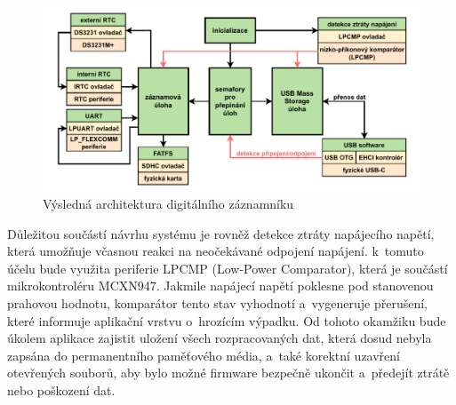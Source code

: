 \begin{figure}[h]
    \centering
    \includegraphics[width=1.00\textwidth]{obrazky-figures/system_architecture.pdf}
    
    \caption{Výsledná architektura digitálního záznamníku}
    \label{fig:system-architecture}
\end{figure}

\newpage

Důležitou součástí návrhu systému je rovněž detekce ztráty napájecího napětí, která umožňuje včasnou reakci na neočekávané odpojení napájení. k~tomuto účelu bude využita periferie LPCMP (Low-Power Comparator), která je součástí mikrokontroléru MCXN947. Jakmile napájecí napětí poklesne pod stanovenou prahovou hodnotu, komparátor tento stav vyhodnotí a~vygeneruje přerušení, které informuje aplikační vrstvu o~hrozícím výpadku. Od tohoto okamžiku bude úkolem aplikace zajistit uložení všech rozpracovaných dat, která dosud nebyla zapsána do permanentního paměťového média, a~také korektní uzavření otevřených souborů, aby bylo možné firmware bezpečně ukončit a~předejít ztrátě nebo poškození dat.






